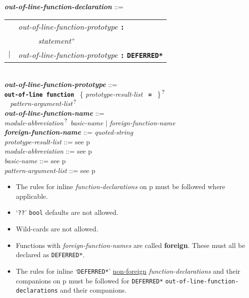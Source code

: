 \documentclass[12pt]{article}
\newcommand{\TT}[1]{{\tt \bfseries #1}}
\newcommand{\PLUS}[1][]{{$^{+#1}$}}
\newcommand{\QMARK}{{$^{\,\mbox{\footnotesize ?}}$}}
\newcommand{\key}[1]{{\rm \bfseries #1}}
\newcommand{\ttkey}[1]{{\tt \bfseries #1}}
\newcommand{\emkey}[1]{{\em \bfseries #1}}
\newcommand{\pagref}[1]{p\pageref{#1}}
\newenvironment{indpar}[1][0.3in]%
	{\begin{list}{}%
		     {\setlength{\itemsep}{0in}%
		      \setlength{\topsep}{0in}%
		      \setlength{\parsep}{1ex}%
		      \setlength{\labelwidth}{#1}%
		      \setlength{\leftmargin}{#1}%
		      \addtolength{\leftmargin}{\labelsep}}%
	 \item}%
	{\end{list}}
\begin{document}
\begin{indpar}
\emkey{out-of-line-function-declaration}%
	\label{OUT-OF-LINE-FUNCTION-DECLARATION} ::= \\
\hspace*{0.5in}
    \begin{tabular}[t]{rl}
        &  {\em out-of-line-function-prototype} \TT{:} \\
	& \TT{~~~~~}{\em statement}\PLUS{} \\
    $|$ &  {\em out-of-line-function-prototype} \TT{:} \ttkey{*DEFERRED*} \\
    \end{tabular}
\\[2ex]
\emkey{out-of-line-function-prototype}%
	\label{OUT-OF-LINE-FUNCTION-PROTOTYPE} ::= \\
\hspace*{0.25in} \ttkey{out-of-line function}~
          \{ {\em prototype-result-list}~ \TT{=}~ \}\QMARK{} \\
\hspace*{0.5in}{\em out-of-line-function-name}~
	      {\em pattern-argument-list}\QMARK{}
\\[0.5ex]
\emkey{out-of-line-function-name} ::= \\
\hspace*{0.25in}
    {\em module-abbreviation}\QMARK{} {\em basic-name}
    $|$ {\em foreign-function-name}
\\[0.5ex]
\emkey{foreign-function-name} ::= {\em quoted-string}
\\[0.5ex]
{\em prototype-result-list} ::= see \pagref{PROTOTYPE-RESULT-LIST}
\\[0.5ex]
{\em module-abbreviation} ::= see \pagref{MODULE-ABBREVIATION}
\\[0.5ex]
{\em basic-name} ::= see \pagref{BASIC-NAME}
\\[0.5ex]
{\em pattern-argument-list} ::= see \pagref{PATTERN-ARGUMENT-LIST}

\begin{itemize}
\item
The rules for inline {\em function-declarations} on
\pagref{FUNCTION-DECLARATION} must be followed where applicable.
\item
`{\tt ??}' {\tt bool} defaults are not allowed.
\item
Wild-cards are not allowed.
\item Functions with {\em foreign-function-names} are called \key{foreign}.
These must all be declared as {\tt *DEFERRED*}.
\item
The rules for inline `{\tt *DEFERRED*}' \underline{non-foreign}
{\em function-declarations} and
their companions on \pagref{COMPANION-DECLARATION}
must be followed for
{\tt *DEFERRED*} {\tt out-of-line-function-de\-clar\-ations}
and their companions.
\end{itemize}
\end{indpar}
\end{document}
